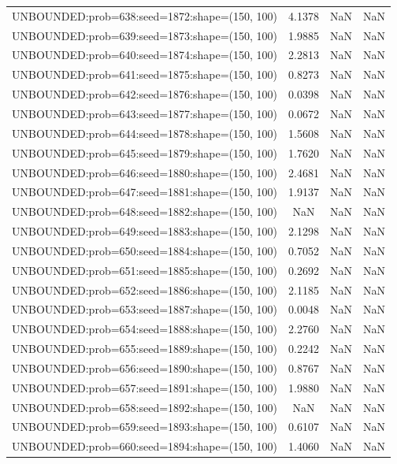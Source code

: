 \begin{longtable}{lccc}
UNBOUNDED:prob=638:seed=1872:shape=(150, 100) &  4.1378 &   NaN &    NaN \\
UNBOUNDED:prob=639:seed=1873:shape=(150, 100) &  1.9885 &   NaN &    NaN \\
UNBOUNDED:prob=640:seed=1874:shape=(150, 100) &  2.2813 &   NaN &    NaN \\
UNBOUNDED:prob=641:seed=1875:shape=(150, 100) &  0.8273 &   NaN &    NaN \\
UNBOUNDED:prob=642:seed=1876:shape=(150, 100) &  0.0398 &   NaN &    NaN \\
UNBOUNDED:prob=643:seed=1877:shape=(150, 100) &  0.0672 &   NaN &    NaN \\
UNBOUNDED:prob=644:seed=1878:shape=(150, 100) &  1.5608 &   NaN &    NaN \\
UNBOUNDED:prob=645:seed=1879:shape=(150, 100) &  1.7620 &   NaN &    NaN \\
UNBOUNDED:prob=646:seed=1880:shape=(150, 100) &  2.4681 &   NaN &    NaN \\
UNBOUNDED:prob=647:seed=1881:shape=(150, 100) &  1.9137 &   NaN &    NaN \\
UNBOUNDED:prob=648:seed=1882:shape=(150, 100) &     NaN &   NaN &    NaN \\
UNBOUNDED:prob=649:seed=1883:shape=(150, 100) &  2.1298 &   NaN &    NaN \\
UNBOUNDED:prob=650:seed=1884:shape=(150, 100) &  0.7052 &   NaN &    NaN \\
UNBOUNDED:prob=651:seed=1885:shape=(150, 100) &  0.2692 &   NaN &    NaN \\
UNBOUNDED:prob=652:seed=1886:shape=(150, 100) &  2.1185 &   NaN &    NaN \\
UNBOUNDED:prob=653:seed=1887:shape=(150, 100) &  0.0048 &   NaN &    NaN \\
UNBOUNDED:prob=654:seed=1888:shape=(150, 100) &  2.2760 &   NaN &    NaN \\
UNBOUNDED:prob=655:seed=1889:shape=(150, 100) &  0.2242 &   NaN &    NaN \\
UNBOUNDED:prob=656:seed=1890:shape=(150, 100) &  0.8767 &   NaN &    NaN \\
UNBOUNDED:prob=657:seed=1891:shape=(150, 100) &  1.9880 &   NaN &    NaN \\
UNBOUNDED:prob=658:seed=1892:shape=(150, 100) &     NaN &   NaN &    NaN \\
UNBOUNDED:prob=659:seed=1893:shape=(150, 100) &  0.6107 &   NaN &    NaN \\
UNBOUNDED:prob=660:seed=1894:shape=(150, 100) &  1.4060 &   NaN &    NaN \\

\end{longtable}
